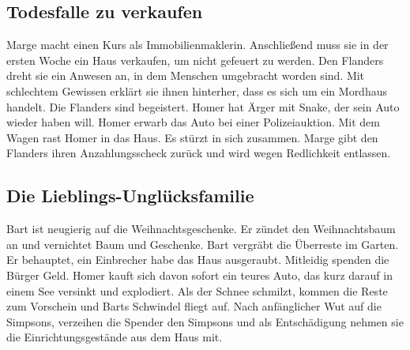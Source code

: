 \subsection{Todesfalle zu verkaufen}\label{5F06}
Marge macht einen Kurs als Immobilienmaklerin. Anschließend muss sie in der ersten Woche ein Haus verkaufen, um nicht gefeuert zu werden. Den Flanders dreht sie ein Anwesen an, in dem Menschen umgebracht worden sind. Mit schlechtem Gewissen erklärt sie ihnen hinterher, dass es sich um ein Mordhaus handelt. Die Flanders sind begeistert. Homer hat Ärger mit Snake, der sein Auto wieder haben will. Homer erwarb das Auto bei einer Polizeiauktion. Mit dem Wagen rast Homer in das Haus. Es stürzt in sich zusammen. Marge gibt den Flanders ihren Anzahlungsscheck zurück und wird wegen Redlichkeit entlassen.

	
\subsection{Die Lieblings-Unglücksfamilie}\label{5F07}
Bart ist neugierig auf die Weihnachtsgeschenke. Er zündet den Weihnachtsbaum an und vernichtet Baum und Geschenke. Bart vergräbt die Überreste im Garten. Er behauptet, ein Einbrecher habe das Haus ausgeraubt. Mitleidig spenden die Bürger Geld. Homer kauft sich davon sofort ein teures Auto, das kurz darauf in einem See versinkt und explodiert. Als der Schnee schmilzt, kommen die Reste zum Vorschein und Barts Schwindel fliegt auf. Nach anfänglicher Wut auf die Simpsons, verzeihen die Spender den Simpsons und als Entschädigung nehmen sie die Einrichtungsgestände aus dem Haus mit.


